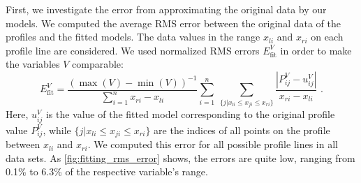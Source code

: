 First, we investigate the error from approximating the original data by our
models. We computed the average \ac{RMS} error between the
original data of the profiles and the fitted models. The data values in the
range $x_{li}$ and $x_{ri}$ on each profile line are considered.
%
%
We used normalized \ac{RMS} errors $E^V_{\text{fit}}$ in order to make the
variables $V$ comparable:
%
%
\begin{equation}
	E^V_{\text{fit}} 
		= 	\frac{(\max(V)-\min(V))^{-1}}{\sum_{i=1}^n x_{ri}-x_{li}} 
			\sum_{i=1}^n~
			\sum_{\{j | x_{li} \leq x_{ji} \leq x_{ri}\}}
						\frac{|P_{ij}^V-u_{ij}^V|}
							{x_{ri}-x_{li}} 
	\text{ .}
\end{equation}
%
Here, $u_{ij}^V$ is the value of the fitted model corresponding to the original
profile value $P_{ij}^V$, while $\{j | x_{li} \leq x_{ji} \leq x_{ri}\}$ are the
indices of all points on the profile between $x_{li}$ and $x_{ri}$. We computed
this error for all possible profile lines in all data sets.
% 
%
As \cref{fig:fitting_rms_error} shows, the errors are quite low, ranging
from 0.1\% to 6.3\% of the respective variable's range.

